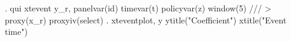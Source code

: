 . qui xtevent y_r, panelvar(id) timevar(t) policyvar(z) window(5) ///
>         proxy(x_r) proxyiv(select)
{\smallskip}
. xteventplot, y  ytitle("Coefficient") xtitle("Event time")
